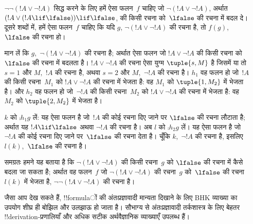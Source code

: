 \documentclass[../../../include/open-logic-section]{subfiles}
\begin{document}
\begin{ex}
$\lnot \lnot (!A \lor \lnot !A)$ सिद्ध करने के लिए हमें ऐसा फलन~$f$ चाहिए
जो $\lnot(!A \lor \lnot !A)$, अर्थात
$(!A \lor (!A \lif \lfalse)) \lif \lfalse$, की किसी रचना को~$\lfalse$
की रचना में बदल दे। दूसरे शब्दों में, हमें ऐसा फलन~$f$ चाहिए कि यदि $g$,
$\lnot(!A \lor \lnot !A)$ की रचना है, तो $f(g)$,~$\lfalse$ की रचना हो।

मान लें कि $g$,~$\lnot(!A \lor \lnot !A)$ की रचना है; अर्थात ऐसा फलन जो
$!A \lor \lnot !A$ की किसी रचना को~$\lfalse$ की रचना में बदलता है।
$!A \lor \lnot !A$ की रचना ऐसा युग्म $\tuple{s, M}$ है जिसमें या तो
$s = 1$ और $M$,~$!A$ की रचना है, अथवा $s = 2$ और $M$,~$\lnot !A$ की
रचना है। $h_1$ वह फलन हो जो~$!A$ की किसी रचना~$M_1$ को
$!A \lor \lnot !A$ की रचना में भेजता है: वह $M_1$ को $\tuple{1, M_2}$ में
भेजता है। और $h_2$ वह फलन हो जो~$\lnot !A$ की किसी रचना~$M_2$ को
$!A \lor \lnot !A$ की रचना में भेजता है: वह $M_2$ को $\tuple{2, M_2}$ में
भेजता है।

$k$ को $\comp{h_1}{g}$ लें: यह ऐसा फलन है जो~$!A$ की कोई रचना दिए जाने पर
$\lfalse$ की रचना लौटाता है; अर्थात यह $!A \lif \lfalse$ अथवा $\lnot !A$
की रचना है। अब $l$ को $\comp{h_2}{g}$ लें। यह ऐसा फलन है जो~$\lnot !A$ की
कोई रचना दिए जाने पर~$\lfalse$ की रचना देता है। चूँकि $k$,~$\lnot !A$ की
रचना है, इसलिए $l(k)$,~$\lfalse$ की रचना है।

समग्रतः हमने यह बताया है कि $\lnot(!A \lor \lnot !A)$ की किसी रचना~$g$ को
$\lfalse$ की रचना में कैसे बदला जा सकता है; अर्थात वह फलन~$f$ जो
$\lnot(!A \lor \lnot !A)$ की रचना~$g$ को~$\lfalse$ की रचना $l(k)$ में
भेजता है, $\lnot\lnot(!A \lor \lnot !A)$ की रचना है।
\end{ex}

जैसा आप देख सकते हैं, !!{formula}ों की अंतःप्रज्ञावादी मान्यता दिखाने के लिए
BHK व्याख्या का उपयोग शीघ्र ही बोझिल और उलझाऊ हो जाता है। सौभाग्य से
अंतःप्रज्ञावादी तर्कशास्त्र के लिए बेहतर !!{derivation}-प्रणालियाँ और अधिक
सटीक अर्थवैज्ञानिक व्याख्याएँ उपलब्ध हैं।
\end{document}
